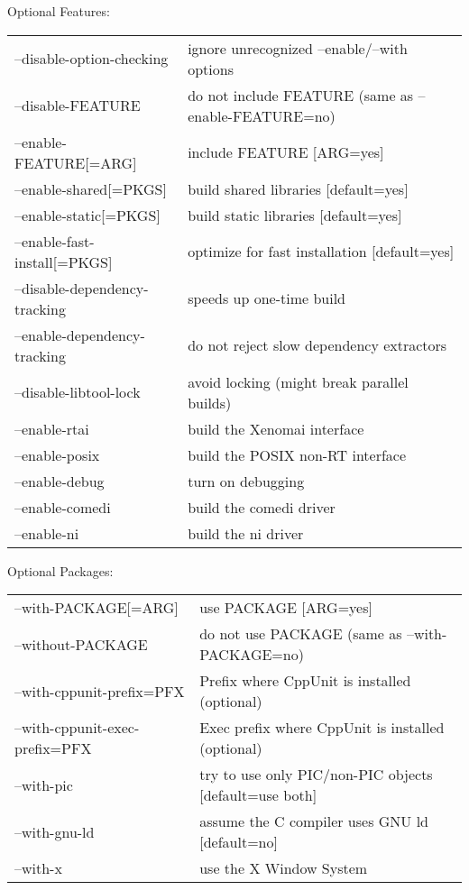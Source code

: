 \begin{maxipage}
\begin{example}
Optional Features:\\ \vspace{.4cm}
\begin{tabular}{ll}
--disable-option-checking &   ignore unrecognized --enable/--with options\\
--disable-FEATURE     &  do not include FEATURE (same as --enable-FEATURE=no)\\
--enable-FEATURE[=ARG]  &  include FEATURE [ARG=yes]\\
--enable-shared[=PKGS]   & build shared libraries [default=yes]\\
--enable-static[=PKGS]  &  build static libraries [default=yes]\\
--enable-fast-install[=PKGS]  & optimize for fast installation [default=yes]\\
--disable-dependency-tracking  &  speeds up one-time build\\
--enable-dependency-tracking   &  do not reject slow dependency extractors\\
--disable-libtool-lock  &  avoid locking (might break parallel builds)\\
--enable-rtai      &   build the Xenomai interface\\
--enable-posix      &     build the POSIX non-RT interface\\
--enable-debug       &    turn on debugging\\
--enable-comedi    &      build the comedi driver\\
--enable-ni        &      build the ni driver
\end{tabular}

Optional Packages:\\ \vspace{.4cm}
\begin{tabular}{ll}
--with-PACKAGE[=ARG]    &  use PACKAGE [ARG=yes]\\
--without-PACKAGE      &   do not use PACKAGE (same as --with-PACKAGE=no)\\
--with-cppunit-prefix=PFX   &  Prefix where CppUnit is installed (optional)\\
--with-cppunit-exec-prefix=PFX   & Exec prefix where CppUnit is installed (optional)\\
--with-pic       &         try to use only PIC/non-PIC objects [default=use both]\\
--with-gnu-ld       &      assume the C compiler uses GNU ld [default=no]\\
--with-x            &      use the X Window System\\
\end{tabular}
\end{example}
\end{maxipage}

